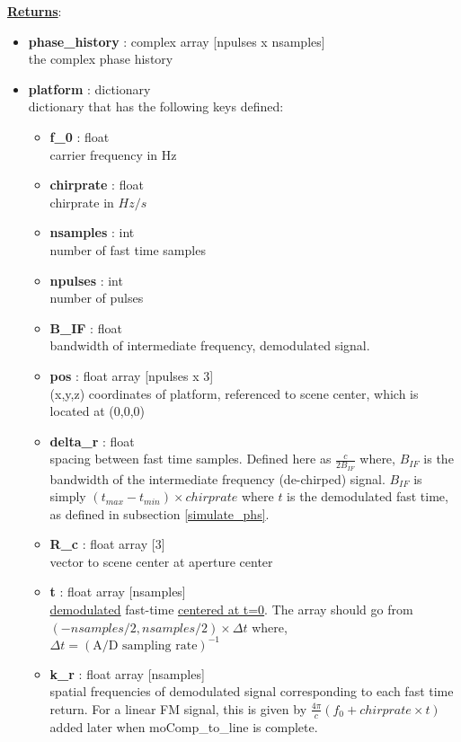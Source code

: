 \documentclass{article}
\newcommand{\defs}[2]{\textbf{{#1}} : {#2}}
\begin{document}
\noindent \underline{\textbf{Returns}}:
\begin{itemize}
	\item \defs{phase\_history}{complex array [npulses x nsamples]}\\
		the complex phase history
	  \item \defs{platform}{dictionary}\\
	  	dictionary that has the following keys defined:
	  \begin{itemize}
	    \item \defs{f\_0}{float}\\
	    	carrier frequency in Hz
		\item \defs{chirprate}{float}\\
		   	chirprate in $Hz/s$
	    \item \defs{nsamples}{int}\\
	    	number of fast time samples
	    \item \defs{npulses}{int}\\
	    	number of pulses
	    \item \defs{B\_IF}{float}\\
	    	bandwidth of intermediate frequency, demodulated signal.
	    \item \defs{pos}{float array [npulses x 3]}\\
	       	(x,y,z) coordinates of platform, referenced to scene center, which is located at (0,0,0)
	    \item \defs{delta\_r}{float}\\
       	   	spacing between fast time samples.  Defined here as $\frac{c}{2B_{IF}}$ where, $B_{IF}$ is the bandwidth of the intermediate frequency (de-chirped) signal.  $B_{IF}$ is simply $(t_{max}-t_{min})\times chirprate$ where $t$ is the demodulated fast time, as defined in subsection \ref{simulate_phs}.
	    \item \defs{R\_c}{float array [3]}\\
	     	vector to scene center at aperture center
	    \item \defs{t}{float array [nsamples]}\\
   	    	\underline{demodulated} fast-time \underline{centered at t=0}.  The array should go from $(-nsamples/2, nsamples/2)\times\Delta t$ where, $\Delta t = (\mbox{A/D sampling rate})^{-1}$
   	    \item\defs{k\_r}{float array [nsamples]}\\
   	    	spatial frequencies of demodulated signal corresponding to each fast time return.  For a linear FM signal, this is given by $\frac{4\pi}{c}(f_0+chirprate\times t)$ added later when moComp\_to\_line is complete.
	  \end{itemize}
\end{itemize}



\end{document}

